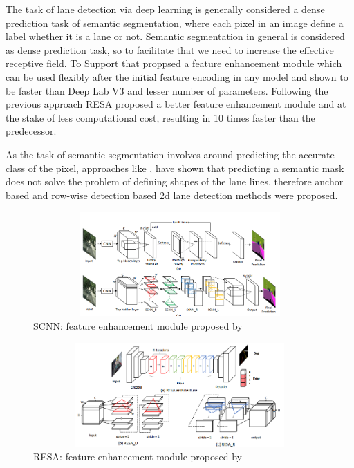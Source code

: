         The task of lane detection via deep learning is generally considered a dense prediction task of semantic segmentation, where each pixel in an image define a label whether it is a lane or not. Semantic segmentation in general is considered as dense prediction task, so to facilitate that we need to increase the effective receptive field. To Support that \cite{DBLP:journals/corr/abs-1712-06080} proppsed a feature enhancement module which can be used flexibly after the initial feature encoding in any model and shown to be faster than Deep Lab V3 \cite{DBLP:journals/corr/ChenPSA17} and lesser number of parameters. Following the previous approach RESA \cite{DBLP:journals/corr/abs-2008-13719} proposed a better feature enhancement module and at the stake of less computational cost, resulting in 10 times faster than the predecessor. 
        
        As the task of semantic segmentation involves around predicting the accurate class of the pixel, approaches like \cite{https://doi.org/10.48550/arxiv.2010.12035}, \cite{inbook} have shown that predicting a semantic mask does not solve the problem of defining shapes of the lane lines, therefore anchor based and row-wise detection based 2d lane detection methods were proposed.
        
         \begin{figure}[h]
    \centering
\includegraphics[width=12cm, height=4cm]{images/scnn_module.png}
    \caption{SCNN: feature enhancement module proposed by  \cite{DBLP:journals/corr/abs-1712-06080}}
    \end{figure}
    
     \begin{figure}[h]
    \centering
\includegraphics[width=12cm, height=4cm]{images/resa_module.png}
    \caption{RESA: feature enhancement module proposed by \cite{DBLP:journals/corr/abs-2008-13719}}
    \end{figure}

